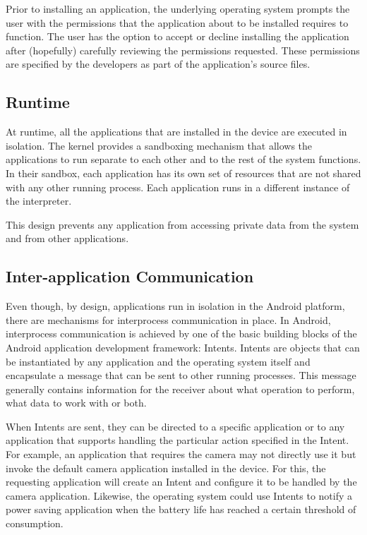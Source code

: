 \documentclass[conference]{IEEEtran}
\begin{document}
Prior to installing an application, the underlying operating system prompts the user with the permissions that the application about to be installed requires to function. The user has the option to accept or decline installing the application after (hopefully) carefully reviewing the permissions requested. These permissions are specified by the developers as part of the application's source files.

\subsection{Runtime}

At runtime, all the applications that are installed in the device are executed in isolation. The kernel provides a sandboxing mechanism that allows the applications to run separate to each other and to the rest of the system functions. In their sandbox, each application has its own set of resources that are not shared with any other running process. Each application runs in a different instance of the interpreter. 

This design prevents any application from accessing private data from the system and from other applications.

\subsection{Inter-application Communication}

Even though, by design, applications run in isolation in the Android platform, there are mechanisms for interprocess communication in place. In Android, interprocess communication is achieved by one of the basic building blocks of the Android application development framework: Intents. Intents are objects that can be instantiated by any application and the operating system itself and encapsulate a message that can be sent to other running processes. This message generally contains information for the receiver about what operation to perform, what data to work with or both.

When Intents are sent, they can be directed to a specific application or to any application that supports handling the particular action specified in the Intent. For example, an application that requires the camera may not directly use it but invoke the default camera application installed in the device. For this, the requesting application will create an Intent and configure it to be handled by the camera application. Likewise, the operating system could use Intents to notify a power saving application when the battery life has reached a certain threshold of consumption.
\end{document}
